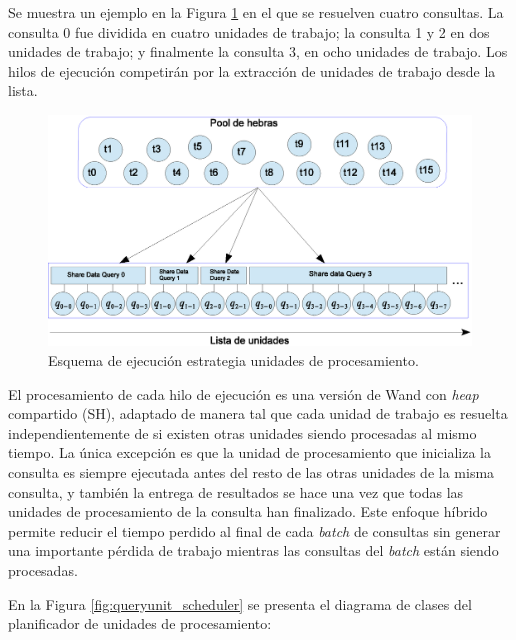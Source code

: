 Se muestra un ejemplo en la Figura \ref{fig:queryunit_execution} en el que se resuelven cuatro consultas. La consulta 0 fue dividida en cuatro unidades de trabajo; la consulta 1 y 2 en dos unidades de trabajo; y finalmente la consulta 3, en ocho unidades de trabajo. Los hilos de ejecución competirán por la extracción de unidades de trabajo desde la lista.

\begin{figure}[tp]
\centering
\includegraphics[scale=.75]{images/QueryUnitExecution.eps}
\caption{Esquema de ejecución estrategia unidades de procesamiento.}
\label{fig:queryunit_execution}
\end{figure}

El procesamiento de cada hilo de ejecución es una versión de Wand con \textit{heap} compartido (SH), adaptado de manera tal que cada unidad de trabajo es resuelta independientemente de si existen otras unidades siendo procesadas al mismo tiempo. La única excepción es que la unidad de procesamiento que inicializa la consulta es siempre ejecutada antes del resto de las otras unidades de la misma consulta, y también la entrega de resultados se hace una vez que todas las unidades de procesamiento de la consulta han finalizado. Este enfoque híbrido permite reducir el tiempo perdido al final de cada \textit{batch} de consultas sin generar una importante pérdida de trabajo mientras las consultas del \textit{batch} están siendo procesadas.

En la Figura \ref{fig:queryunit_scheduler} se presenta el diagrama de clases del planificador de unidades de procesamiento:

